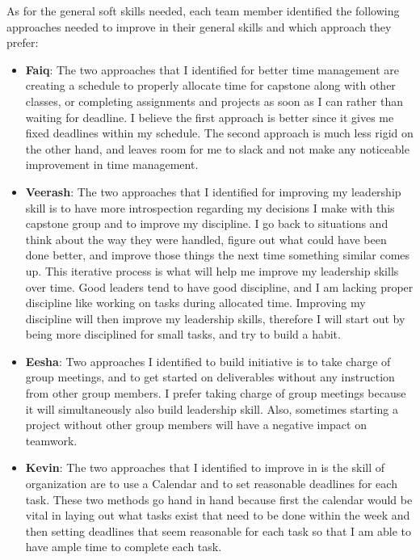 \documentclass[12pt, titlepage]{article}
\begin{document}
\begin{enumerate}
\begin{itemize}
		\end{itemize}
		
		As for the general soft skills needed, each team member identified the following approaches needed to improve in their general skills and which approach they prefer:
		\begin{itemize}
			\item \textbf{Faiq}: The two approaches that I identified for better time management are creating a schedule to properly allocate time for capstone along with other classes, or completing assignments and projects as soon as I can rather than waiting for deadline. I believe the first approach is better since it gives me fixed deadlines within my schedule. The second approach is much less rigid on the other hand, and leaves room for me to slack and not make any noticeable improvement in time management.
			
			\item \textbf{Veerash}: The two approaches that I identified for improving my leadership skill is to have more introspection regarding my decisions I make with this capstone group and to improve my discipline. I go back to situations and think about the way they were handled, figure out what could have been done better, and improve those things the next time something similar comes up. This iterative process is what will help me improve my leadership skills over time. Good leaders tend to have good discipline, and I am lacking proper discipline like working on tasks during allocated time. Improving my discipline will then improve my leadership skills, therefore I will start out by being more disciplined for small tasks, and try to build a habit.
			
			\item \textbf{Eesha}: Two approaches I identified to build initiative is to take charge of group meetings, and to get started on deliverables without any instruction from other group members. I prefer taking charge of group meetings because it will simultaneously also build leadership skill. Also, sometimes starting a project without other group members will have a negative impact on teamwork.
			
			\item \textbf{Kevin}: The two approaches that I identified to improve in is the skill of organization are to use a Calendar and to set reasonable deadlines for each task. These two methods go hand in hand because first the calendar would be vital in laying out what tasks exist that need to be done within the week and then setting deadlines that seem reasonable for each task so that I am able to have ample time to complete each task.  
		\end{itemize}
	\end{enumerate}
	
\end{document}
